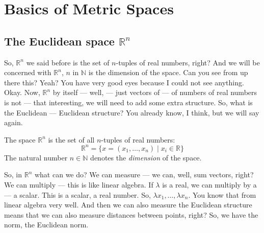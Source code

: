 \setcounter{section}{0}
\section{Basics of Metric Spaces}
\setcounter{subsection}{0}
\subsection{The Euclidean space \texorpdfstring{$\mathbb{R}^n$}{Rn}}

\begin{spoken-clean}[00:17:15 - 00:19:02]
So, $\mathbb{R}^n$ we said before is the set of $n$-tuples of real numbers, right?  And we will be concerned with $\mathbb{R}^n$, $n$ in $\mathbb{N}$ is the dimension of the space. Can you see from up there this? Yeah? You have very good eyes because I could not see anything. Okay. Now, $\mathbb{R}^n$ by itself --- well, --- just vectors of --- of numbers of real numbers is not --- that interesting, we will need to add some extra structure. So, what is the Euclidean --- Euclidean structure? You already know, I think, but we will say again.
\end{spoken-clean}

\begin{math-stroke}
\setcounter{theorem}{0}
\begin{definition}
The space $\mathbb{R}^n$ is the set of all $n$-tuples of real numbers:
\[ \mathbb{R}^n = \{ x = (x_1, \dots, x_n) \mid x_i \in \mathbb{R} \} \]
The natural number $n \in \mathbb{N}$ denotes the \emph{dimension} of the space.
\end{definition}
\end{math-stroke}

\begin{spoken-clean}[00:19:02 - 00:21:18]
So, in $\mathbb{R}^n$ what can we do? We can measure --- we can, well, sum vectors, right?  We can multiply --- this is like linear algebra. If $\lambda$ is a real, we can multiply by a --- a scalar. This is a scalar, a real number. So, $\lambda x_1, \dots, \lambda x_n$. You know that from linear algebra very well. And then we can also measure the Euclidean structure means that we can also measure distances between points, right? So, we have the norm, the Euclidean norm. 
\end{spoken-clean}

